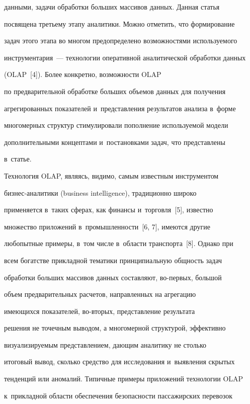 данными, задачи обработки больших массивов данных. Данная статья 


посвящена третьему этапу аналитики. Можно отметить, что формирование 


задач этого этапа во многом предопределено возможностями используемого 


инструментария~--- технологии оперативной аналитической обработки данных 


(OLAP~[4]). Более конкретно, возможности OLAP 


по предварительной обработке больших объемов данных для получения 


агрегированных показателей и~представления результатов анализа в~форме 


многомерных структур стимулировали пополнение используемой модели 


дополнительными концептами и~постановками задач, что представлены 


в~статье.


       





      Технология OLAP, являясь, видимо, самым известным инструментом  


биз\-нес-ана\-ли\-ти\-ки (business intelligence), традиционно широко 


применяется в~таких сферах, как финансы и~торговля~[5], известно 


множество приложений в~промышленности~[6, 7], имеются другие 


любопытные примеры, в~том числе в~области транспорта~[8]. Однако при 


всем богатстве прикладной тематики принципиальную общ\-ность задач 


обработки больших массивов данных составляют, во-пер\-вых, большой 


объем предварительных расчетов, направленных на агрегацию  


име\-ющих\-ся показателей, во-вто\-рых, пред\-став\-ле\-ние результата 


решения не точечным выводом, а многомерной структурой, эффективно 


визуализируемым пред\-став\-ле\-ни\-ем, да\-ющим аналитику не столько 


итоговый вывод, сколько средство для исследования и~выявления скрытых 


тенденций или аномалий. Типичные примеры приложений технологии OLAP


 к~прикладной области обеспечения безопасности пассажирских перевозок 


